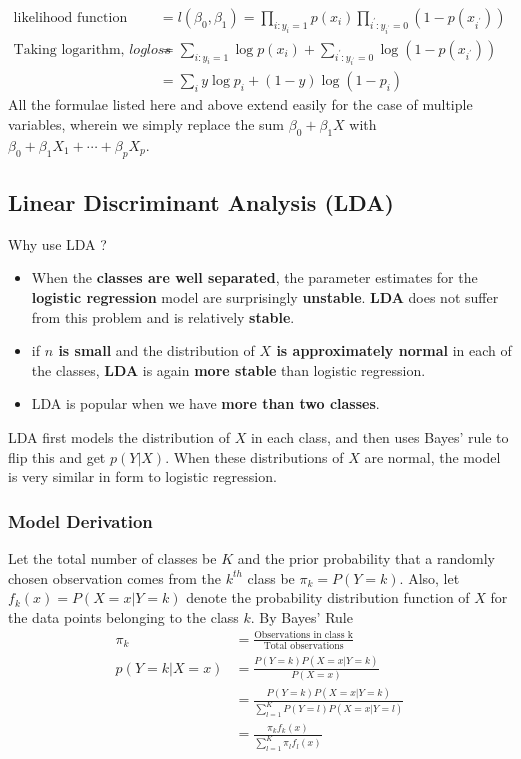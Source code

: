 \documentclass[11pt, a4paper]{article}
\begin{document}
    \begin{align*}
        \text{likelihood function} &= l(\beta_{0},\beta_{1}) = \prod_{i:y_{i}=1} p(x_{i}) \prod_{i^{'}:y_{i^{'}}=0}(1-p(x_{i^{'}}))\\
        \text{Taking logarithm, } logloss &= \sum_{i:y_{i}=1} \log p(x_{i}) + \sum_{i^{'}:y_{i^{'}}=0}\log (1-p(x_{i^{'}}))\\
        &= \sum_{i} y\log p_{i} + (1-y)\log (1-p_{i}) \tag*{since $y = 0$ or $1$}
    \end{align*}
    All the formulae listed here and above extend easily for the case of multiple variables, wherein we simply replace the sum $\beta_{0} + \beta_{1}X$ with $\beta_{0} + \beta_{1}X_{1} + \cdots + \beta_{p}X_{p}$.


    \subsection{Linear Discriminant Analysis (LDA)}
    Why use LDA ?
    \begin{itemize}
        \item When the \textbf{classes are well separated}, the parameter estimates for the \textbf{logistic regression} model are surprisingly \textbf{unstable}. \textbf{LDA} does not suffer from this problem and is relatively \textbf{stable}.
        \item if \textbf{$n$ is small} and the distribution of \textbf{$X$ is approximately normal} in each of the classes, \textbf{LDA} is again \textbf{more stable} than logistic regression.
        \item LDA is popular when we have \textbf{more than two classes}.
    \end{itemize}

    LDA first models the distribution of $X$ in each class, and then uses Bayes' rule to flip this and get $p(Y|X)$. When these distributions of $X$ are normal, the model is very similar in form to logistic regression.

    \subsubsection{Model Derivation}
    Let the total number of classes be $K$ and the prior probability that a randomly chosen observation comes from the $k^{th}$ class be $\pi_{k} = P(Y=k)$. Also, let $f_{k}(x) = P(X=x|Y=k)$ denote the probability distribution function of $X$ for the data points belonging to the class $k$. By Bayes' Rule
    \begin{align*}
        \pi_{k} &= \frac{\text{Observations in class k}}{\text{Total observations}}\\
        p(Y=k|X=x) &= \frac{P(Y=k)P(X=x|Y=k)}{P(X=x)}\\
                &= \frac{P(Y=k)P(X=x|Y=k)}{\sum_{l=1}^{K} P(Y=l)P(X=x|Y=l)}\\
                &=  \frac{\pi_{k}f_{k}(x)}{\sum_{l=1}^{K}\pi_{l}f_{l}(x)}
    \end{align*}
\end{document}
